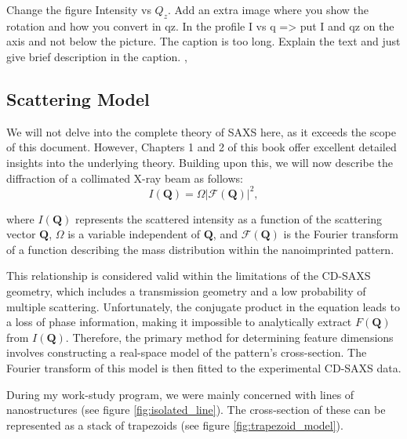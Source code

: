 \color{red} Change the figure Intensity vs $Q_z$. Add an extra image where you show the rotation and how you convert in qz.
In the profile I vs q => put I and qz on the axis and not below the picture. The caption is too long. Explain the text and just give brief description in the caption. \color{black},

\FloatBarrier

\subsection{Scattering Model} \label{sec:scattering_model}

\medskip
We will not delve into the complete theory of SAXS here, as it exceeds the scope of this document. 
However, Chapters 1 and 2 of this book \cite{bookSaxs} offer excellent detailed insights into the underlying 
theory. Building upon this, we will now describe the diffraction of a collimated X-ray beam as follows:
\begin{equation}
    I(\mathbf{Q}) = \varOmega | \mathcal{F}(\mathbf{Q}) |^2,
\end{equation}
    
where $I(\mathbf{Q})$ represents the scattered intensity as a function of the scattering
vector $\mathbf{Q}$, $\Omega$ is a variable independent of $\mathbf{Q}$,
and $\mathcal{F}(\mathbf{Q})$ is the Fourier transform of a function describing the mass
distribution within the nanoimprinted pattern. 
    
This relationship is considered valid within the limitations of the CD-SAXS geometry,
which includes a transmission geometry and a low probability of multiple scattering.    
Unfortunately, the conjugate product in the equation leads to a loss of phase
information, making it impossible to analytically extract $F(\mathbf{Q})$ from $I(\mathbf{Q})$.
Therefore, the primary method for determining feature dimensions involves constructing
a real-space model of the pattern's cross-section. The Fourier transform of this 
model is then fitted to the experimental CD-SAXS data.

\medskip

During my work-study program, we were mainly concerned with lines of nanostructures (see figure \ref{fig:isolated_line}). The cross-section of
these can be represented as a stack of trapezoids (see figure \ref{fig:trapezoid_model}).

